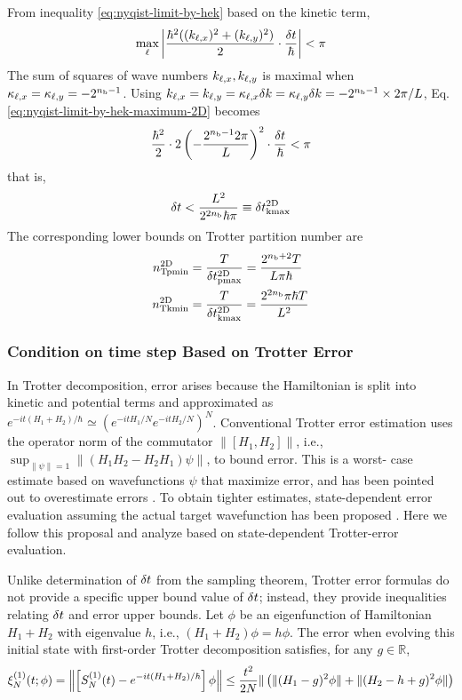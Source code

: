 \documentclass[a4paper,11pt]{article}
\begin{document}
From inequality \eqref{eq:nyqist-limit-by-hek} based on the kinetic term,
\begin{equation}
\max_{\ell}{\left| \frac{\hbar^2((k_{\ell,x})^2+(k_{\ell,y})^2)}{2}\cdot\frac{\delta t}{\hbar} \right|} < \pi
\label{eq:nyqist-limit-by-hek-maximum-2D}
\end{equation}
The sum of squares of wave numbers $k_{\ell,x},k_{\ell,y}$ is maximal when
$\kappa_{\ell,x}=\kappa_{\ell,y}=-2^{n_{\mathrm{b}}-1}$. Using
$k_{\ell,x}=k_{\ell,y}=\kappa_{\ell,x}\delta k=\kappa_{\ell,y}\delta k=-2^{n_{\mathrm{b}}-1}\times2\pi/L$,
Eq. \eqref{eq:nyqist-limit-by-hek-maximum-2D} becomes
\begin{equation}
\frac{\hbar^2}{2}\cdot2\left(-\frac{2^{n_{\mathrm{b}}-1}2\pi}{L}\right)^2\cdot\frac{\delta t}{\hbar}<\pi
\end{equation}
that is,
\begin{equation}
\delta t < \frac{L^2}{2^{2n_{\mathrm{b}}}\hbar\pi} \equiv\delta t_{\mathrm{kmax}}^{\mathrm{2D}}
 \label{eq:nyqist-limit-by-hek-final-2D}
\end{equation}
The corresponding lower bounds on Trotter partition number are
\begin{align}
    n_{\mathrm{Tpmin}}^{\mathrm{2D}} &= \frac{T}{\delta t_{\mathrm{pmax}}^{\mathrm{2D}}}=\frac{2^{n_{\mathrm{b}}+2}T}{L\pi\hbar} \\
    n_{\mathrm{Tkmin}}^{\mathrm{2D}} &= \frac{T}{\delta t_{\mathrm{kmax}}^{\mathrm{2D}}}=\frac{2^{2n_{\mathrm{b}}}\pi\hbar T}{L^2}
\end{align}


\subsubsection{Condition on time step Based on Trotter Error}
\label{subsec:deltat-selection-by-trotter-error}
In Trotter decomposition, error arises because the Hamiltonian is split into
kinetic and potential terms and approximated as
$e^{-it(H_1+H_2)/\hbar}\simeq\left(e^{-i{tH}_1/N}e^{-itH_2/N}\right)^N$.
Conventional Trotter error estimation uses the operator norm of the commutator
$\| [H_1,H_2] \|$, i.e.,
$\sup_{\|\psi\|=1}\|(H_1H_2-H_2H_1)\psi\|$, to bound error. This is a worst-
case estimate based on wavefunctions $\psi$ that maximize error, and has been
pointed out to overestimate errors
\cite{Childs2021.PhysRevX.11.011020}.
To obtain tighter estimates, state-dependent error evaluation assuming the
actual target wavefunction has been proposed
\cite{Burgarth2024.PhysRevResearch.6.043155}. Here we follow this proposal and
analyze based on state-dependent Trotter-error evaluation.

Unlike determination of $\delta t$ from the sampling theorem, Trotter error
formulas do not provide a specific upper bound value of $\delta t$; instead,
they provide inequalities relating $\delta t$ and error upper bounds. Let
$\phi$ be an eigenfunction of Hamiltonian $H_1+H_2$ with eigenvalue $h$, i.e.,
$\left(H_1+H_2\right)\phi=h\phi$. The error when evolving this initial state
with first-order Trotter decomposition satisfies, for any
$g\in\mathbb{R}$,
\begin{equation}
    \xi_{N}^{(1)}(t;\phi)=\left\|\left[S_{N}^{(1)}(t)-e^{-it(H_1+H_2)/\hbar}\right]\phi\right\|
    \leq\frac{t^2}{2N}\| \left(\|(H_1-g)^2\phi\|+\|(H_2-h+g)^2\phi\|\right)
    \label{eq:observed-trotter-error-1st}
\end{equation}
\end{document}
